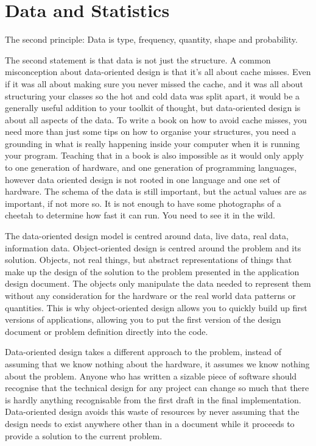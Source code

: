 \section{Data and Statistics}

The second principle: Data is type, frequency, quantity, shape and probability.

The second statement is that data is not just the structure. A common
misconception about data-oriented design is that it's all about cache misses.
Even if it was all about making sure you never missed the cache, and it was all
about structuring your classes so the hot and cold data was split apart, it
would be a generally useful addition to your toolkit of thought, but
data-oriented design is about all aspects of the data. To write a book on how
to avoid cache misses, you need more than just some tips on how to organise
your structures, you need a grounding in what is really happening inside your
computer when it is running your program. Teaching that in a book is also
impossible as it would only apply to one generation of hardware, and one
generation of programming languages, however data oriented design is not rooted
in one language and one set of hardware. The schema of the data is still
important, but the actual values are as important, if not more so. It is not
enough to have some photographs of a cheetah to determine how fast it can run.
You need to see it in the wild.

The data-oriented design model is centred around data, live data, real data,
information data. Object-oriented design is centred around the problem and its
solution. Objects, not real things, but abstract representations of things that
make up the design of the solution to the problem presented in the application
design document. The objects only manipulate the data needed to represent them
without any consideration for the hardware or the real world data patterns or
quantities. This is why object-oriented design allows you to quickly build up
first versions of applications, allowing you to put the first version of the
design document or problem definition directly into the code. 

Data-oriented design takes a different approach to the problem, instead of
assuming that we know nothing about the hardware, it assumes we know nothing
about the problem. Anyone who has written a sizable piece of software should
recognise that the technical design for any project can change so much that
there is hardly anything recognisable from the first draft in the final
implementation. Data-oriented design avoids this waste of resources by never
assuming that the design needs to exist anywhere other than in a document while
it proceeds to provide a solution to the current problem.

